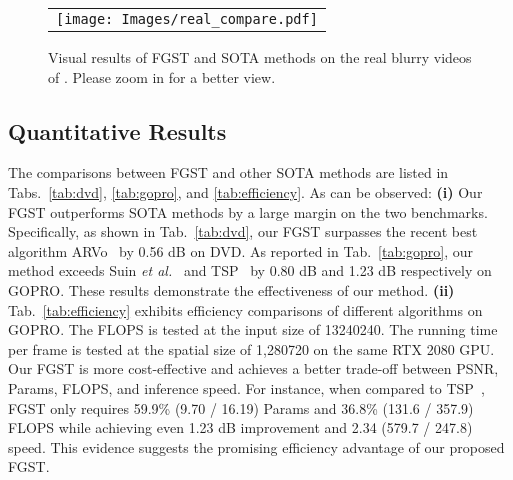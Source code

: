 \documentclass{article}
\begin{document}
	\begin{figure*}[t]
		\begin{center}
			\begin{tabular}[t]{c} \hspace{-2mm}
				\texttt{[image: Images/real\_compare.pdf]}
			\end{tabular}
		\end{center}
		\vspace*{-5mm}
		\caption{\small Visual results of FGST and SOTA methods on the real blurry videos of  \cite{real_blur}. Please zoom in for a better view.}
		\label{fig:real}
		\vspace{-2mm}
	\end{figure*}
	
	\subsection{Quantitative Results}
	\vspace{-1mm}
	The comparisons between FGST and other SOTA methods are listed in Tabs.~\ref{tab:dvd}, \ref{tab:gopro}, and \ref{tab:efficiency}. As can be observed: \textbf{(i)} Our FGST outperforms SOTA methods by a large margin on the two benchmarks. Specifically, as shown in Tab.~\ref{tab:dvd}, our FGST surpasses the recent best algorithm ARVo~\cite{arvo} by 0.56 dB on DVD. As reported in Tab.~\ref{tab:gopro}, our method exceeds Suin \emph{et al.}~\cite{Suin} and TSP~\cite{tsp} by 0.80 dB and 1.23 dB respectively on GOPRO. These results demonstrate the effectiveness of our method. \textbf{(ii)} Tab.~\ref{tab:efficiency} exhibits efficiency comparisons of different algorithms on GOPRO. The FLOPS is tested at the input size of 13240240. The running time per frame is tested at the spatial size of 1,280720 on the same RTX 2080 GPU. Our FGST is more cost-effective and achieves a better trade-off between PSNR, Params, FLOPS, and inference speed. For instance, when compared to TSP~\cite{tsp}, FGST only requires 59.9\% (9.70 / 16.19) Params and 36.8\% (131.6 / 357.9) FLOPS while achieving even 1.23 dB improvement and 2.34 (579.7 / 247.8) speed. This evidence suggests the promising efficiency advantage of our proposed FGST.
	
	\vspace{-1mm}
\end{document}
